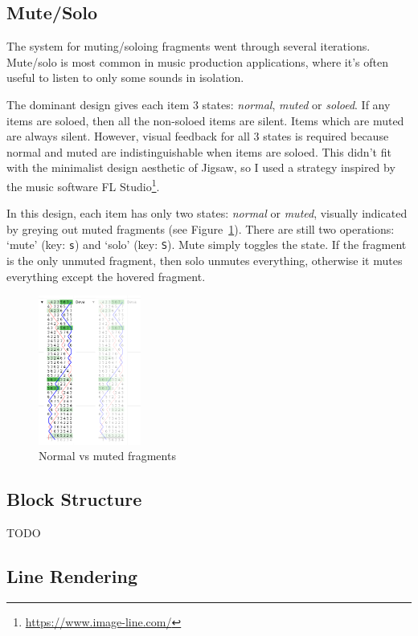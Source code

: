 \documentclass[12pt]{article}
\newcommand{\footurl}[1]{\footnote{\url{#1}}}
\begin{document}
\subsection{Mute/Solo}

The system for muting/soloing fragments went through several iterations.  Mute/solo is most common
in music production applications, where it's often useful to listen to only some sounds in
isolation.

The dominant design gives each item 3 states: \emph{normal}, \emph{muted} or \emph{soloed}.  If any
items are soloed, then all the non-soloed items are silent.  Items which are muted are always
silent.  However, visual feedback for all 3 states is required because normal and muted are
indistinguishable when items are soloed.  This didn't fit with the minimalist design aesthetic of
Jigsaw, so I used a strategy inspired by the music software FL
Studio\footurl{https://www.image-line.com/}.

In this design, each item has only two states: \emph{normal} or \emph{muted}, visually indicated by
greying out muted fragments (see Figure~\ref{fig:frag-mute}).  There are still two operations:
`mute' (key: \verb|s|) and `solo' (key: \verb|S|).  Mute simply toggles the state.  If the fragment
is the only unmuted fragment, then solo unmutes everything, otherwise it mutes everything except the
hovered fragment.

\begin{figure}
    \centering
    \includegraphics[width=0.3\textwidth]{muted-frag}
    \caption{Normal vs muted fragments}\label{fig:frag-mute}
\end{figure}


\subsection{Block Structure}

TODO

\subsection{Line Rendering}
\end{document}
